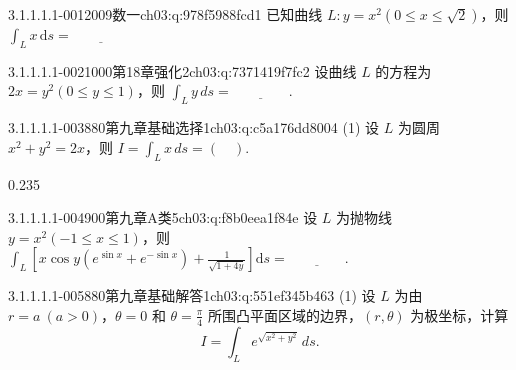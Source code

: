 \par\addvspace{2.4ex}\noindent
\begin{minipage}{\linewidth}




\begin{q}{3.1.1.1.1-001}{2009数一}{ch03:q:978f5988fcd1}
已知曲线 $L: y=x^2(0\leqslant x\leqslant \sqrt{2})$，则 $\displaystyle \int_L x\,\mathrm{d}s=\underline{\hspace{4em}}$
\end{q}
\end{minipage}


\begin{q}{3.1.1.1.1-002}{1000第18章强化2}{ch03:q:7371419f7fc2}
设曲线 $L$ 的方程为 $2x=y^2(0\leqslant y\leqslant 1)$，则 $\displaystyle \int_L y\,ds=\underline{\hspace{4em}}.$
\end{q}

\begin{q}{3.1.1.1.1-003}{880第九章基础选择1}{ch03:q:c5a176dd8004}
(1) 设 $L$ 为圆周 $x^2+y^2=2x$，则 $\displaystyle I=\int_L x\,ds=(\quad)$.
\begin{opts}{0.235}
\hfill{}\hfill{}\hfill{}
\end{opts}
\end{q}

\begin{q}{3.1.1.1.1-004}{900第九章A类5}{ch03:q:f8b0eea1f84e}
设 $L$ 为抛物线 $y=x^2(-1 \leqslant x \leqslant 1)$，则
$\displaystyle \int_L\left[x\cos y\left(e^{\sin x}+e^{-\sin x}\right)+\frac{1}{\sqrt{1+4y}}\right]\mathrm{d}s=\underline{\hspace{4em}}.$
\end{q}

\begin{q}{3.1.1.1.1-005}{880第九章基础解答1}{ch03:q:551ef345b463}
(1) 设 $L$ 为由 $r=a\ (a>0)$，$\theta=0$ 和 $\theta=\frac{\pi}{4}$ 所围凸平面区域的边界，$(r,\theta)$ 为极坐标，计算 \[ I=\int_L e^{\sqrt{x^2+y^2}}\,ds. \]
\end{q}

